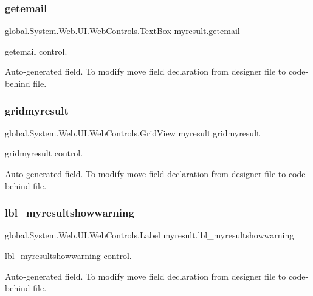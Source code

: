\subsubsection{\texorpdfstring{getemail}{getemail}}
{\footnotesize\ttfamily global.\+System.\+Web.\+U\+I.\+Web\+Controls.\+Text\+Box myresult.\+getemail\hspace{0.3cm}{\ttfamily [protected]}}



getemail control. 

Auto-\/generated field. To modify move field declaration from designer file to code-\/behind file. \mbox{\label{classmyresult_a12067ac0664f564afd5d4b37979df13a}} 
\subsubsection{\texorpdfstring{gridmyresult}{gridmyresult}}
{\footnotesize\ttfamily global.\+System.\+Web.\+U\+I.\+Web\+Controls.\+Grid\+View myresult.\+gridmyresult\hspace{0.3cm}{\ttfamily [protected]}}



gridmyresult control. 

Auto-\/generated field. To modify move field declaration from designer file to code-\/behind file. \mbox{\label{classmyresult_a86cb5b940d1515bdf6637054e7dcaead}} 
\subsubsection{\texorpdfstring{lbl\_myresultshowwarning}{lbl\_myresultshowwarning}}
{\footnotesize\ttfamily global.\+System.\+Web.\+U\+I.\+Web\+Controls.\+Label myresult.\+lbl\+\_\+myresultshowwarning\hspace{0.3cm}{\ttfamily [protected]}}



lbl\+\_\+myresultshowwarning control. 

Auto-\/generated field. To modify move field declaration from designer file to code-\/behind file. \mbox{\label{classmyresult_abc9ba45a21776e13c371e76f926691b5}} 
